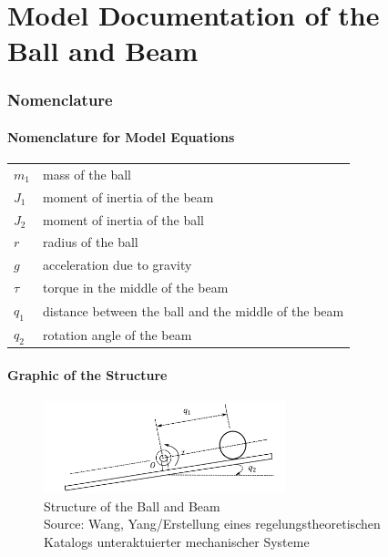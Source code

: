 \documentclass[10pt,a4paper]{article}
\begin{document}
	\part*{Model Documentation of the \\ Ball and Beam} %
	
	
	\section{Nomenclature} %
	\subsection{Nomenclature for Model Equations} %
	
	\begin{tabular}{ll}
		$m_1$ & mass of the ball \\
		$J_1$ & moment of inertia of the beam \\
		$J_2$ & moment of inertia of the ball \\
		$r$ & radius of the ball \\
		$g$ & acceleration due to gravity \\
		$\tau$ & torque in the middle of the beam \\
		$q_1$ & distance between the ball and the middle of the beam \\
		$q_2$ & rotation angle of the beam \\
				
	\end{tabular}
	 
	\subsection{Graphic of the Structure}	
	\begin{figure}[H]
		\centering
		\captionsetup{justification=centering, margin=1cm}
		\includegraphics[width=70mm]{ball_beam.pdf}
		\caption{Structure of the Ball and Beam \\ \footnotesize{Source: Wang, Yang/Erstellung eines regelungstheoretischen Katalogs unteraktuierter mechanischer Systeme}}
	\end{figure}
	
\end{document}
